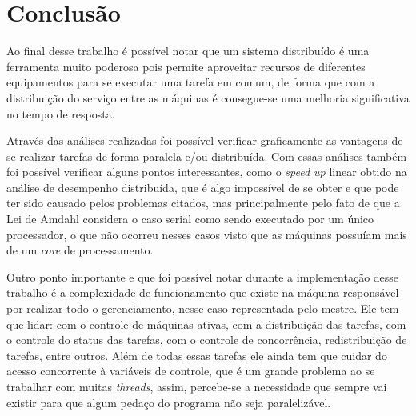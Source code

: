 \documentclass[
	12pt,				%
    oneside,			%
	a4paper,			%
	english,			%
	brazil,				%
	]{abntex2}
\begin{document}
\chapter{Conclusão}

Ao final desse trabalho é possível notar que um sistema distribuído é uma ferramenta muito poderosa pois permite aproveitar recursos de diferentes equipamentos para se executar uma tarefa em comum, de forma que com a distribuição do serviço entre as máquinas é consegue-se uma melhoria significativa no tempo de resposta. 

Através das análises realizadas foi possível verificar graficamente as vantagens de se realizar tarefas de forma paralela e/ou distribuída. Com essas análises também foi possível verificar alguns pontos interessantes, como o \textit{speed up} linear obtido na análise de desempenho distribuída, que é algo impossível de se obter e que pode ter sido causado pelos problemas citados, mas principalmente pelo fato de que a Lei de Amdahl considera o caso serial como sendo executado por um único processador, o que não ocorreu nesses casos visto que as máquinas possuíam mais de um \textit{core} de processamento.

Outro ponto importante e que foi possível notar durante a implementação desse trabalho é a complexidade de funcionamento que existe na máquina responsável por realizar todo o gerenciamento, nesse caso representada pelo mestre. Ele tem que lidar: com o controle de máquinas ativas, com a distribuição das tarefas, com o controle do status das tarefas, com o controle de concorrência, redistribuição de tarefas, entre outros. Além de todas essas tarefas ele ainda tem que cuidar do acesso
concorrente à variáveis de controle, que é um grande problema ao se trabalhar com muitas \textit{threads}, assim, percebe-se a necessidade que sempre vai existir para que algum pedaço do programa não seja paralelizável.


\postextual


\end{document}
